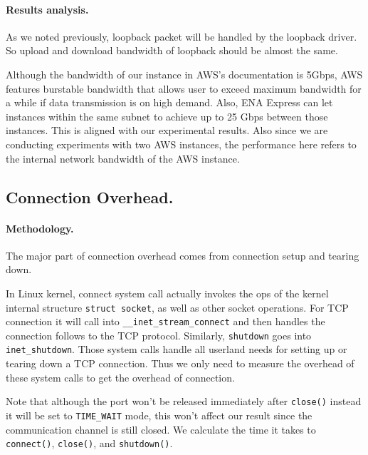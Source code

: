 \paragraph{Results analysis.} As we noted previously, loopback packet will be handled by the loopback driver. So upload and download bandwidth of loopback should be almost the same. 

Although the bandwidth of our instance in AWS's documentation is 5Gbps, AWS features burstable bandwidth that allows user to exceed maximum bandwidth for a while if data transmission is on high demand. Also, ENA Express can let instances within the same subnet to achieve up to 25 Gbps between those instances\cite{amazonec2}. This is aligned with our experimental results. Also since we are conducting experiments with two AWS instances, the performance here refers to the internal network bandwidth of the AWS instance.

\subsection{Connection Overhead.} 
\paragraph{Methodology.} The major part of connection overhead comes from connection setup and tearing down. 

In Linux kernel, connect system call actually invokes the ops of the kernel internal structure \texttt{struct socket}, as well as other socket operations. For TCP connection it will call into \texttt{\_\_inet\_stream\_connect} and then handles the connection follows to the TCP protocol. Similarly, \texttt{shutdown} goes into \texttt{inet\_shutdown}. Those system calls handle all userland needs for setting up or tearing down a TCP connection. Thus we only need to measure the overhead of these system calls to get the overhead of connection.

Note that although the port won't be released immediately after \texttt{close()} instead it will be set to \texttt{TIME\_WAIT} mode, this won't affect our result since the communication channel is still closed. We calculate the time it takes to \texttt{connect()}, \texttt{close()}, and \texttt{shutdown()}.

